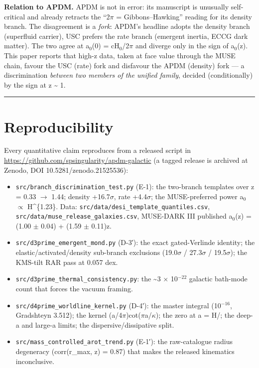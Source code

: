 \documentclass[aps,prd,preprint,nofootinbib,superscriptaddress]{revtex4-2}
\providecommand{\tightlist}{\setlength{\itemsep}{0pt}\setlength{\parskip}{0pt}}
\begin{document}
\textbf{Relation to APDM.} APDM is not in error: its manuscript is
unusually self-critical and already retracts the ``2\(\pi\) =
Gibbons--Hawking'' reading for its density branch. The disagreement is a
\emph{fork}: APDM's headline adopts the density branch (superfluid
carrier), USC prefers the rate branch (emergent inertia, ECCG dark
matter). The two agree at a\(_{0}\)(0) = cH\(_{0}\)/2\(\pi\) and diverge
only in the sign of a\(_{0}\)(z). This paper reports that high-z data,
taken at face value through the MUSE chain, favour the USC (rate) fork
and disfavour the APDM (density) fork --- a discrimination \emph{between
two members of the unified family}, decided (conditionally) by the sign
at z \textasciitilde{} 1.

\begin{center}\rule{0.5\linewidth}{0.5pt}\end{center}

\section{Reproducibility}\label{sec-9}

Every quantitative claim reproduces from a released script in
\url{https://github.com/spsingularity/apdm-galactic} (a tagged release
is archived at Zenodo, DOI 10.5281/zenodo.21525536):

\begin{itemize}
\tightlist
\item
  \texttt{src/\allowbreak branch\_\allowbreak discrimination\_\allowbreak test.\allowbreak py} (E-1): the two-branch
  templates over z = 0.33 \(\to\) 1.44; density +16.7\(\sigma\), rate
  +4.4\(\sigma\); the MUSE-preferred power a\(_{0}\) \(\propto\)
  H\^{}\{1.23\}. Data: \texttt{src/\allowbreak data/\allowbreak desi\_\allowbreak template\_\allowbreak quantiles.\allowbreak csv},
  \texttt{src/\allowbreak data/\allowbreak muse\_\allowbreak release\_\allowbreak galaxies.\allowbreak csv}, MUSE-DARK III published
  a\(_{0}\)(z) = (1.00 \(\pm\) 0.04) + (1.59 \(\pm\) 0.11)z.
\item
  \texttt{src/\allowbreak d3prime\_\allowbreak emergent\_\allowbreak mond.\allowbreak py} (D-3′): the exact
  gated-Verlinde identity; the elastic/activated/density sub-branch
  exclusions (19.0\(\sigma\) / 27.3\(\sigma\) / 19.5\(\sigma\)); the
  KMS-tilt RAR pass at 0.057 dex.
\item
  \texttt{src/\allowbreak d3prime\_\allowbreak thermal\_\allowbreak consistency.\allowbreak py}: the \textasciitilde3 ×
  10\(^{-22}\) galactic bath-mode count that forces the vacuum framing.
\item
  \texttt{src/\allowbreak d4prime\_\allowbreak worldline\_\allowbreak kernel.\allowbreak py} (D-4′): the master integral
  (10\(^{-16}\), Gradshteyn 3.512); the kernel
  (a/4\(\pi\))cot(\(\pi\)a/\(\kappa\)); the zero at a = H/; the
  deep-a and large-a limits; the dispersive/dissipative split.
\item
  \texttt{src/\allowbreak mass\_\allowbreak controlled\_\allowbreak arot\_\allowbreak trend.\allowbreak py} (E-1′): the
  raw-catalogue radius degeneracy (corr(r\_max, z) = 0.87) that makes
  the released kinematics inconclusive.
\end{itemize}
\end{document}
